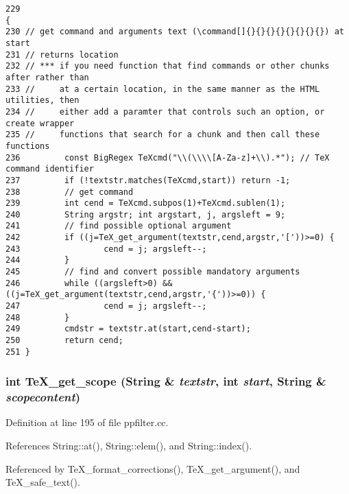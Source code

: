 \footnotesize\begin{verbatim}229                                                                   {
230 // get command and arguments text (\command[]{}{}{}{}{}{}{}{}) at start
231 // returns location
232 // *** if you need function that find commands or other chunks after rather than
233 //     at a certain location, in the same manner as the HTML utilities, then
234 //     either add a paramter that controls such an option, or create wrapper
235 //     functions that search for a chunk and then call these functions
236         const BigRegex TeXcmd("\\(\\\\[A-Za-z]+\\).*"); // TeX command identifier
237         if (!textstr.matches(TeXcmd,start)) return -1;
238         // get command
239         int cend = TeXcmd.subpos(1)+TeXcmd.sublen(1);
240         String argstr; int argstart, j, argsleft = 9;
241         // find possible optional argument
242         if ((j=TeX_get_argument(textstr,cend,argstr,'['))>=0) {
243                 cend = j; argsleft--;
244         }
245         // find and convert possible mandatory arguments
246         while ((argsleft>0) && ((j=TeX_get_argument(textstr,cend,argstr,'{'))>=0)) {
247                 cend = j; argsleft--;
248         }
249         cmdstr = textstr.at(start,cend-start);
250         return cend;
251 }
\end{verbatim}\normalsize 
{}
\subsubsection{\setlength{\rightskip}{0pt plus 5cm}int Te\-X\_\-get\_\-scope ({\bf String} \& {\em textstr}, int {\em start}, {\bf String} \& {\em scopecontent})}\label{ppfilter_8cc_a4}




Definition at line 195 of file ppfilter.cc.

References String::at(), String::elem(), and String::index().

Referenced by Te\-X\_\-format\_\-corrections(), Te\-X\_\-get\_\-argument(), and Te\-X\_\-safe\_\-text().




